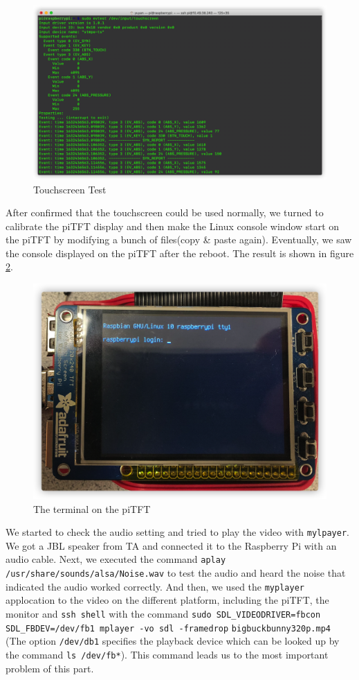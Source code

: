 \documentclass[12pt]{report}
\newcommand{\code}[1]{\colorbox{light-gray}{\texttt{#1}}}
\begin{document}
\begin{figure}[H]
    \includegraphics[width=\textwidth]{img/Figure5.png}
    \centering
    \caption{Touchscreen Test}
    \label{fig:fig5}
\end{figure}
After confirmed that the touchscreen could be used normally, we turned to calibrate the piTFT display and then make the Linux console window start on the piTFT by modifying a bunch of files(copy \& paste again). Eventually, we saw the console displayed on the piTFT after the reboot. The result is shown in figure \ref{fig:fig6}.\par
\begin{figure}[H]
    \includegraphics[width=16cm]{img/Figure6.png}
    \centering
    \caption{The terminal on the piTFT}
    \label{fig:fig6}
\end{figure}
We started to check the audio setting and tried to play the video with \code{mylpayer}. We got a JBL speaker from TA and connected it to the Raspberry Pi with an audio cable. Next, we executed the command \code{aplay /usr/share/sounds/alsa/Noise.wav} to test the audio and heard the noise that indicated the audio worked correctly. And then, we used the \code{myplayer} applocation to the video on the different platform, including the piTFT, the monitor and \code{ssh shell} with the command \code{sudo SDL\_VIDEODRIVER=fbcon SDL\_FBDEV=/dev/fb1 mplayer -vo sdl -framedrop} \code{bigbuckbunny320p.mp4} (The option \code{/dev/db1} specifies the playback device which can be looked up by the command \code{ls /dev/fb*}). This command leads us to the most important problem of this part.\par
\end{document}
